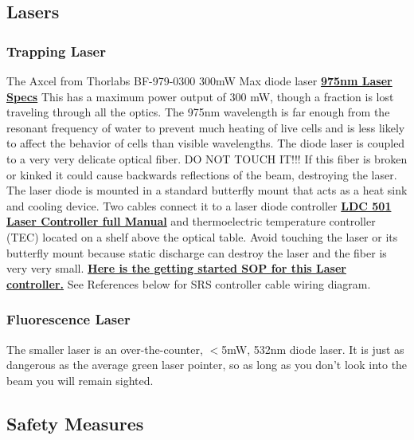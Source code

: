 \documentclass{../lab}
\begin{document}
\subsection{Lasers}

\subsubsection{Trapping Laser}

The Axcel from Thorlabs BF-979-0300 300mW Max diode laser \href{https://berkeley-physics111b.github.io/assets/pdf/oldwebsitestructure/images/975nm-Laser-Specs.pdf}{\textbf{975nm Laser Specs}} This has a maximum power output of 300 mW, though a fraction is lost traveling through all the optics. The 975nm wavelength is far enough from the resonant frequency of water to prevent much heating of live cells and is less likely to affect the behavior of cells than visible wavelengths. The diode laser is coupled to a very very delicate optical fiber. DO NOT TOUCH IT!!! If this fiber is broken or kinked it could cause backwards reflections of the beam, destroying the laser. The laser diode is mounted in a standard butterfly mount that acts as a heat sink and cooling device. Two cables connect it to a laser diode controller \href{https://berkeley-physics111b.github.io/assets/pdf/oldwebsitestructure/images/LDC501m.pdf}{\textbf{LDC 501 Laser Controller full Manual}} and thermoelectric temperature controller (TEC) located on a shelf above the optical table. Avoid touching the laser or its butterfly mount because static discharge can destroy the laser and the fiber is very very small. \href{https://berkeley-physics111b.github.io/assets/pdf/oldwebsitestructure/images/SOP\_Laser\_Diode\_Driver.pdf}{\textbf{Here is the getting started SOP for this Laser controller.}} See References below for SRS controller cable wiring diagram.

\subsubsection{Fluorescence Laser}

The smaller laser is an over-the-counter, $<$5mW, 532nm diode laser. It is just as dangerous as the average green laser pointer, so as long as you don't look into the beam you will remain sighted.

\subsection{Safety Measures}
\end{document}

